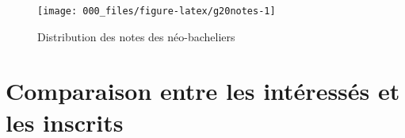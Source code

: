 \documentclass[
]{book}
\begin{document}
\begin{figure}[H]

{\centering \texttt{[image: 000\_files/figure-latex/g20notes-1]} 

}

\caption{Distribution des notes des néo-bacheliers}\label{fig:g20notes}
\end{figure}

\newpage

\newpage

\setcounter{table}{0}
\setcounter{figure}{0}

\hypertarget{g20compintinsc}{%
\section{Comparaison entre les intéressés et les inscrits}\label{g20compintinsc}}

\begingroup\fontsize{6}{8}\selectfont
\end{document}
